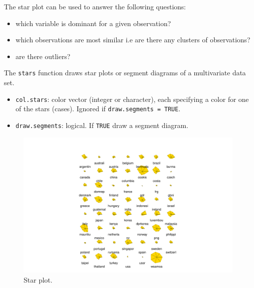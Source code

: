 \documentclass[a4paper]{article}
\newcommand{\highspace}{\vspace{1.2em}\noindent}
\begin{document}
    \highspace
    The star plot can be used to answer the following questions:
    \begin{itemize}
        \item which variable is dominant for a given observation?
        \item which observations are most similar i.e are there any clusters of observations?
        \item are there outliers?
    \end{itemize}
    The \texttt{stars} function draws star plots or segment diagrams of a multivariate data set.
    \begin{itemize}
        \item \texttt{col.stars}: color vector (integer or character), each specifying a color for one of the stars (cases). Ignored if \texttt{draw.segments = TRUE}.

        \item \texttt{draw.segments}: logical. If \texttt{TRUE} draw a segment diagram.
    \end{itemize}
    
    \begin{figure}[!htp]
        \centering
        \includegraphics[width=\textwidth]{img/visualization-of-multivariate-data-4.pdf}
        \caption*{Star plot.}
    \end{figure}
\end{document}

